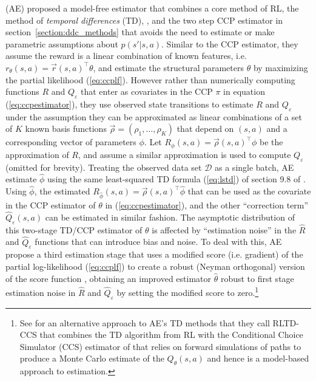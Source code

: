 \citet{AE:2022} (AE) proposed a model-free estimator that combines a core method of RL, the method of {\it temporal differences\/} (TD),
\citet{BartoSutton:2020}, and the two step \citet{hotzmiller:1993} CCP estimator in
section~\ref{section:ddc_methods} that avoids the need to estimate or make parametric assumptions about $p(s'|s,a)$. Similar to the CCP estimator, they
assume the reward is a linear combination of known features, i.e. $r_\theta(s,a)=\vec{r}(s,a)^{\top}\theta$,
and  estimate the structural parameters $\theta$ by maximizing the partial likelihood (\ref{eq:ccplf}). 
However rather than numerically computing functions $R$ and $Q_\varepsilon$ that
enter as covariates in the CCP $\pi$ in equation (\ref{eq:ccpestimator}), they use observed state transitions
to estimate  $R$ and $Q_\varepsilon$ under the assumption they can be approximated as linear
combinations of a set of $K$ known basis functions $\vec{\rho}=(\rho_1,\ldots,\rho_K)$ that depend on $(s,a)$ and a 
corresponding  vector of parameters $\phi$. Let $R_\phi(s,a) = \vec{\rho}(s,a)^{\top}\phi$
be the approximation of $R$, and assume a similar approximation is used to compute $Q_\varepsilon$ (omitted for brevity).
Treating the observed data set $\mathcal{D}$ as a single batch, 
AE estimate $\hat\phi$ using the same least-squared TD formula (\ref{eq:lstd}) of section 9.8 of \citet{BartoSutton:2020}.
Using $\hat\phi$, the estimated $R_{\hat\phi}(s,a)=\vec{\rho}(s,a)^\top\hat\phi$ that can be used as the covariate 
in the CCP estimator of  $\theta$ in (\ref{eq:ccpestimator}), and the other ``correction term''  $\hat Q_\varepsilon(s,a)$
can be estimated in similar fashion. The asymptotic distribution of this two-stage TD/CCP estimator of $\theta$  is 
 affected by ``estimation noise'' in the $\hat R$ and $\hat Q_{\varepsilon}$ functions
that can introduce bias and noise. To deal with this, AE propose a third estimation stage that uses  
a modified  score (i.e. gradient) of the  partial log-likelihood (\ref{eq:ccplf}) to create 
a robust (Neyman orthogonal) version of the score function \citep{lrspe:2022},
obtaining an improved estimator $\hat\theta$ robust to first stage estimation
noise in $\hat R$ and $\hat Q_\varepsilon$ by setting the modified score to zero.\footnote{\footnotesize
See \citet{khwaja:2025} for an alternative approach to AE's TD methods that they call RLTD-CCS that combines the TD algorithm 
from RL with the Conditional Choice Simulator (CCS) estimator of \citet{hmss:1994} that relies on forward simulations
of paths to produce a Monte Carlo estimate of the $Q_\theta(s,a)$  and hence is a model-based approach to estimation.}

